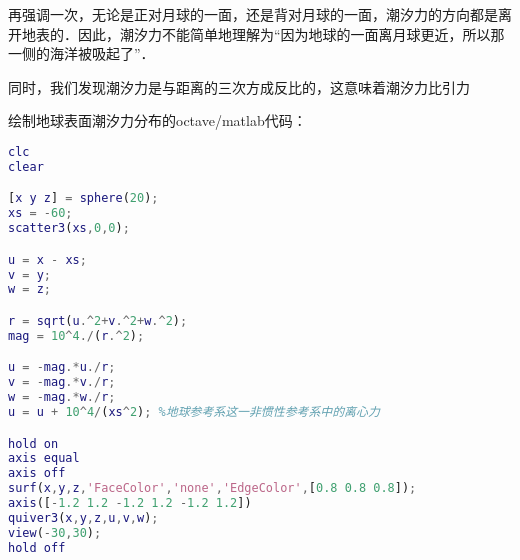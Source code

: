 再强调一次，无论是正对月球的一面，还是背对月球的一面，潮汐力的方向都是离开地表的．因此，潮汐力不能简单地理解为“因为地球的一面离月球更近，所以那一侧的海洋被吸起了”．

同时，我们发现潮汐力是与距离的三次方成反比的，这意味着潮汐力比引力

绘制地球表面潮汐力分布的octave/matlab代码：
\begin{lstlisting}[language=matlab]
clc
clear

[x y z] = sphere(20);
xs = -60;
scatter3(xs,0,0);

u = x - xs;
v = y;
w = z;

r = sqrt(u.^2+v.^2+w.^2);
mag = 10^4./(r.^2);

u = -mag.*u./r;
v = -mag.*v./r;
w = -mag.*w./r;
u = u + 10^4/(xs^2); %地球参考系这一非惯性参考系中的离心力

hold on
axis equal
axis off
surf(x,y,z,'FaceColor','none','EdgeColor',[0.8 0.8 0.8]);
axis([-1.2 1.2 -1.2 1.2 -1.2 1.2])
quiver3(x,y,z,u,v,w);
view(-30,30);
hold off

\end{lstlisting}